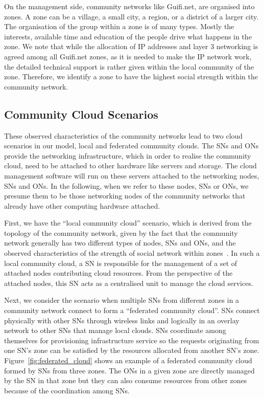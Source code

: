 On the management side, community networks like Guifi.net, are organised into zones. 
A zone can be a village, a small city, a region, or a district of a larger city. 
The organisation of the group within a zone is of many types. 
Mostly the interests, available time and education of the people drive what happens in the zone. 
We note that while the allocation of IP addresses and layer 3 networking is agreed among all Guifi.net zones, 
as it is needed to make the IP network work, 
the detailed technical support is rather given within the local community of the zone. 
Therefore, we identify a zone to have the highest social strength within the community network.


\subsection{Community Cloud Scenarios}

These observed characteristics of the community networks lead to two cloud scenarios in our model, 
local and federated community clouds.
The SNs and ONs provide the networking infrastructure, which in order to realise the community cloud, need to be attached to other hardware like servers and storage.
The cloud management software will run on these servers attached to the networking nodes, SNs and ONs.
In the following, when we refer to these nodes, SNs or ONs, we presume them to be 
those networking nodes of the community networks 
that already have other computing hardware attached.

First, we have the \enquote{local community cloud} scenario, 
which is derived from the topology of the community network, given by the fact that 
the community network generally has two different types of nodes, SNs and ONs, 
and the observed characteristics of the strength of social network within zones~\cite{Vega2012}. 
In such a local community cloud, a SN is responsible for the management of a set of attached nodes contributing cloud resources. 
From the perspective of the attached nodes, this SN acts as a centralised unit to manage the cloud services. 

Next, we consider the scenario when multiple SNs from different zones in a community network connect to form a \enquote{federated community cloud}.
SNs connect physically with other SNs through wireless links and logically in an overlay network to other SNs that manage local clouds.
SNs coordinate among themselves for provisioning infrastructure service so the requests originating from one SN's zone can be satisfied by the resources allocated from another SN's zone.
Figure~\ref{fig:federated_cloud} shows an example of a federated community cloud formed by SNs from three zones.
The ONs in a given zone are directly managed by the SN in that zone but they can also consume resources from other zones because of the coordination among SNs.

